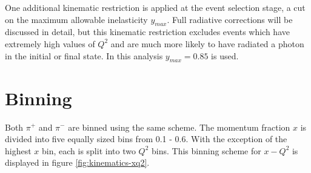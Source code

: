 One additional kinematic restriction is applied at the event selection stage, a cut on the maximum allowable inelasticity $y_{max}$.  Full radiative corrections will be discussed in detail, but this kinematic restriction excludes events which have extremely high values of $Q^2$ and are much more likely to have radiated a photon in the initial or final state.  In this analysis $y_{max} = 0.85$ is used.  

\section{Binning}
Both $\pi^+$ and $\pi^-$ are binned using the same scheme.  The momentum fraction $x$ is divided into five equally sized bins from 0.1 - 0.6.  With the exception of the highest $x$ bin, each is split into two $Q^2$ bins.  This binning scheme for $x-Q^2$ is displayed in figure \ref{fig:kinematics-xq2}.  \\

